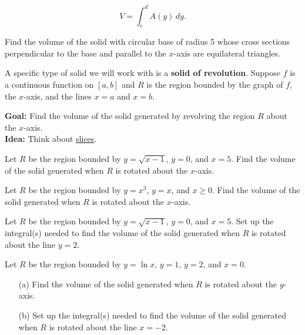 \documentclass[12pt]{article}
\begin{document}
$$V=\int_c^d A(y)\,dy.$$

\newpage

\Example Find the volume of the solid with circular base of radius 5 whose cross sections perpendicular to the base and parallel to the $x$-axis are equilateral triangles.

\vspace{80mm}

A specific type of solid we will work with is a \textbf{solid of revolution}. Suppose $f$ is a continuous function on $[a,b]$ and $R$ is the region bounded by the graph of $f$, the $x$-axis, and the lines $x=a$ and $x=b$.

\vspace{50mm}

\textbf{Goal:} Find the volume of the solid generated by revolving the region $R$ about the $x$-axis.\\

\textbf{Idea:} Think about \underline{slices}.

\newpage 

\Example Let $R$ be the region bounded by $y=\sqrt{x-1}$, $y=0$, and $x=5$. Find the volume of the solid generated when $R$ is rotated about the $x$-axis.

\vspace{100mm}

\Example Let $R$ be the region bounded by $y=x^3$, $y=x$, and $x\geq 0$. Find the volume of the solid generated when $R$ is rotated about the $x$-axis.

\newpage

\Example Let $R$ be the region bounded by $y=\sqrt{x-1}$, $y=0$, and $x=5$. Set up the integral(s) needed to find the volume of the solid generated when $R$ is rotated about the line $y=2$.

\vspace{70mm}

\Example Let $R$ be the region bounded by $y=\ln x$, $y=1$, $y=2$, and $x=0$.

\begin{itemize}
\item[(a)] Find the volume of the solid generated when $R$ is rotated about the $y$-axis.

\vspace{70mm}

\item[(b)] Set up the integral(s) needed to find the volume of the solid generated when $R$ is rotated about the line $x=-2$.
\end{itemize}

\newpage
\end{document}
